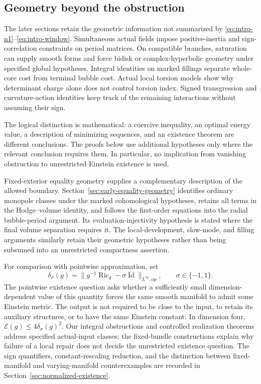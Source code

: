 \documentclass[10pt,a4paper]{article}
\theoremstyle{definition}
\theoremstyle{remark}
\numberwithin{equation}{section}
\providecommand{\Ric}{\operatorname{Ric}}
\providecommand{\E}{\mathcal E}
\providecommand{\Id}{\operatorname{Id}}
\begin{document}
\subsection{Geometry beyond the obstruction}
The later sections retain the geometric information not summarized by
\eqref{eq:intro-n1}--\eqref{eq:intro-window}. Simultaneous actual
fields impose positive-inertia and sign-correlation constraints on
period matrices. On compatible branches, saturation can supply smooth
forms and force bidisk or complex-hyperbolic geometry under specified
global hypotheses. Integral identities on marked fillings separate
whole-core cost from terminal bubble cost. Actual local torsion models
show why determinant charge alone does not control torsion index.
Signed transgression and curvature-action identities keep track of the
remaining interactions without assuming their sign.

The logical distinction is mathematical: a coercive inequality, an
optimal energy value, a description of minimizing sequences, and an
existence theorem are different conclusions. The proofs below use
additional hypotheses only where the relevant conclusion requires them.
In particular, no implication from vanishing obstruction to unrestricted
Einstein existence is used.

Fixed-exterior equality geometry supplies a complementary description
of the allowed boundary. Section~\ref{sec:early-equality-geometry}
identifies ordinary monopole classes under the marked cohomological
hypotheses, retains all terms in the Hodge--volume identity, and follows
the first-order equations into the radial bubble-period argument.
Its evaluation-injectivity hypothesis is stated where the final volume
separation requires it. The local-development, slow-mode, and filling
arguments similarly retain their geometric hypotheses rather than
being subsumed into an unrestricted compactness assertion.

For comparison with pointwise approximation, set
\[
 \delta_\sigma(g)=\|g^{-1}\Ric_g-\sigma\Id\|_{L^\infty,\mathrm{op}},
 \qquad \sigma\in\{-1,1\}.
\]
The pointwise existence question asks whether a sufficiently small
dimension-dependent value of this quantity forces the same smooth
manifold to admit some Einstein metric. The output is not required to
be close to the input, to retain its auxiliary structures, or to have
the same Einstein constant. In dimension four, $\E(g)\le4\delta_\sigma(g)^2$.
Our integral obstructions and controlled realization theorems address
specified actual-input classes; the fixed-bundle constructions explain
why failure of a local repair does not decide the unrestricted existence
question.
The sign quantifiers, constant-rescaling reduction, and the distinction
between fixed-manifold and varying-manifold counterexamples are recorded
in Section~\ref{sec:normalized-existence}.
\end{document}
